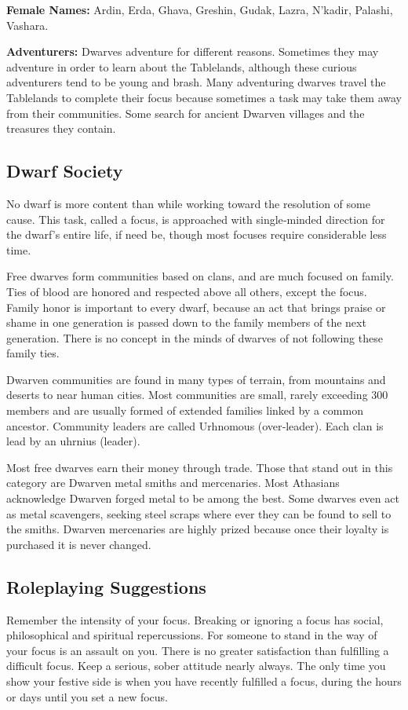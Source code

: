 \documentclass[10pt,a4paper,twocolumn]{d20}
\begin{document}
\textbf{Female Names:} Ardin, Erda, Ghava, Greshin, Gudak, Lazra, N’kadir, Palashi, Vashara.

\textbf{Adventurers:} Dwarves adventure for different reasons. Sometimes they may adventure in order to learn about the Tablelands, although these curious adventurers tend to be young and brash. Many adventuring dwarves travel the Tablelands to complete their focus because sometimes a task may take them away from their communities. Some search for ancient Dwarven villages and the treasures they contain.

\subsection{Dwarf Society}
No dwarf is more content than while working toward the resolution of some cause. This task, called a focus, is approached with single‐minded direction for the dwarf’s entire life, if need be, though most focuses require considerable less time.

Free dwarves form communities based on clans, and are much focused on family. Ties of blood are honored and respected above all others, except the focus. Family honor is important to every dwarf, because an act that brings praise or shame in one generation is passed down to the family members of the next generation. There is no concept in the minds of dwarves of not following these family ties.

Dwarven communities are found in many types of terrain, from mountains and deserts to near human cities. Most communities are small, rarely exceeding 300 members and are usually formed of extended families linked by a common ancestor. Community leaders are called Urhnomous (over‐leader). Each clan is lead by an uhrnius (leader).

Most free dwarves earn their money through trade. Those that stand out in this category are Dwarven metal smiths and mercenaries. Most Athasians acknowledge Dwarven forged metal to be among the best. Some dwarves even act as metal scavengers, seeking steel scraps where ever they can be found to sell to the smiths. Dwarven mercenaries are highly prized because once their loyalty is purchased it is never changed.

\subsection{Roleplaying Suggestions}
Remember the intensity of your focus. Breaking or ignoring a focus has social, philosophical and spiritual repercussions. For someone to stand in the way of your focus is an assault on you. There is no greater satisfaction than fulfilling a difficult focus. Keep a serious, sober attitude nearly always. The only time you show your festive side is when you have recently fulfilled a focus, during the hours or days until you set a new focus.
\end{document}
